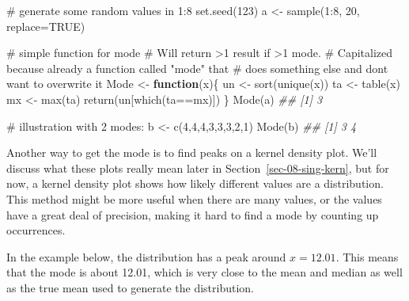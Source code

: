 \documentclass[
  13,
  letterpaper,
]{report}
\newenvironment{Shaded}{\begin{snugshade}}{\end{snugshade}}
\newcommand{\AttributeTok}[1]{\textcolor[rgb]{0.40,0.45,0.13}{#1}}
\newcommand{\CommentTok}[1]{\textcolor[rgb]{0.37,0.37,0.37}{#1}}
\newcommand{\ConstantTok}[1]{\textcolor[rgb]{0.56,0.35,0.01}{#1}}
\newcommand{\ControlFlowTok}[1]{\textcolor[rgb]{0.00,0.23,0.31}{\textbf{#1}}}
\newcommand{\DecValTok}[1]{\textcolor[rgb]{0.68,0.00,0.00}{#1}}
\newcommand{\DocumentationTok}[1]{\textcolor[rgb]{0.37,0.37,0.37}{\textit{#1}}}
\newcommand{\FunctionTok}[1]{\textcolor[rgb]{0.28,0.35,0.67}{#1}}
\newcommand{\NormalTok}[1]{\textcolor[rgb]{0.00,0.23,0.31}{#1}}
\newcommand{\OtherTok}[1]{\textcolor[rgb]{0.00,0.23,0.31}{#1}}
\newcommand{\SpecialCharTok}[1]{\textcolor[rgb]{0.37,0.37,0.37}{#1}}
\begin{document}
\begin{Shaded}
\begin{Highlighting}[]

\CommentTok{\# generate some random values in 1:8}
\FunctionTok{set.seed}\NormalTok{(}\DecValTok{123}\NormalTok{)}
\NormalTok{a }\OtherTok{\textless{}{-}} \FunctionTok{sample}\NormalTok{(}\DecValTok{1}\SpecialCharTok{:}\DecValTok{8}\NormalTok{, }\DecValTok{20}\NormalTok{, }\AttributeTok{replace=}\ConstantTok{TRUE}\NormalTok{)}

\CommentTok{\# simple function for mode}
\CommentTok{\# Will return \textgreater{}1 result if \textgreater{}1 mode.}
\CommentTok{\# Capitalized because already a function called "mode" that}
\CommentTok{\# does something else and don\textquotesingle{}t want to overwrite it}
\NormalTok{Mode }\OtherTok{\textless{}{-}} \ControlFlowTok{function}\NormalTok{(x)\{}
\NormalTok{    un }\OtherTok{\textless{}{-}} \FunctionTok{sort}\NormalTok{(}\FunctionTok{unique}\NormalTok{(x))}
\NormalTok{    ta }\OtherTok{\textless{}{-}} \FunctionTok{table}\NormalTok{(x)}
\NormalTok{    mx }\OtherTok{\textless{}{-}} \FunctionTok{max}\NormalTok{(ta)}
    \FunctionTok{return}\NormalTok{(un[}\FunctionTok{which}\NormalTok{(ta}\SpecialCharTok{==}\NormalTok{mx)])}
\NormalTok{\}}
\FunctionTok{Mode}\NormalTok{(a)}
\DocumentationTok{\#\# [1] 3}

\CommentTok{\# illustration with 2 modes:}
\NormalTok{b }\OtherTok{\textless{}{-}} \FunctionTok{c}\NormalTok{(}\DecValTok{4}\NormalTok{,}\DecValTok{4}\NormalTok{,}\DecValTok{4}\NormalTok{,}\DecValTok{3}\NormalTok{,}\DecValTok{3}\NormalTok{,}\DecValTok{3}\NormalTok{,}\DecValTok{2}\NormalTok{,}\DecValTok{1}\NormalTok{)}
\FunctionTok{Mode}\NormalTok{(b)}
\DocumentationTok{\#\# [1] 3 4}
\end{Highlighting}
\end{Shaded}

Another way to get the mode is to find peaks on a kernel density plot.
We'll discuss what these plots really mean later in
Section~\ref{sec-08-sing-kern}, but for now, a kernel density plot shows
how likely different values are a distribution. This method might be
more useful when there are many values, or the values have a great deal
of precision, making it hard to find a mode by counting up occurrences.

In the example below, the distribution has a peak around \(x=12.01\).
This means that the mode is about 12.01, which is very close to the mean
and median as well as the true mean used to generate the distribution.
\end{document}

